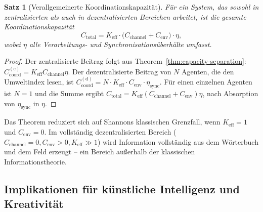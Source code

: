 \documentclass[12pt,a4paper]{article}
\newtheorem{theorem}{Satz}[section]
\theoremstyle{remark}
\begin{document}
	\begin{theorem}[Verallgemeinerte Koordinationskapazität]
		Für ein System, das sowohl in zentralisierten als auch in dezentralisierten Bereichen arbeitet, ist die gesamte Koordinationskapazität
		\begin{equation}
			\boxed{C_{\mathrm{total}} = K_{\mathrm{eff}} \cdot \bigl( C_{\mathrm{channel}} + C_{\mathrm{env}} \bigr) \cdot \eta},
			\label{eq:generalized-capacity}
		\end{equation}
		wobei \(\eta\) alle Verarbeitungs- und Synchronisationsüberhälte umfasst.
	\end{theorem}
	
	\begin{proof}
		Der zentralisierte Beitrag folgt aus Theorem~\ref{thm:capacity-separation}: \(C_{\mathrm{coord}}^{\mathrm{(c)}} = K_{\mathrm{eff}} C_{\mathrm{channel}} \eta\). Der dezentralisierte Beitrag von \(N\) Agenten, die den Umweltindex lesen, ist \(C_{\mathrm{coord}}^{\mathrm{(d)}} = N \cdot K_{\mathrm{eff}} \cdot C_{\mathrm{env}} \cdot \eta_{\mathrm{sync}}\). Für einen einzelnen Agenten ist \(N=1\) und die Summe ergibt \(C_{\mathrm{total}} = K_{\mathrm{eff}}(C_{\mathrm{channel}} + C_{\mathrm{env}})\eta\), nach Absorption von \(\eta_{\mathrm{sync}}\) in \(\eta\).
	\end{proof}
	
	Das Theorem reduziert sich auf Shannons klassischen Grenzfall, wenn \(K_{\mathrm{eff}} = 1\) und \(C_{\mathrm{env}} = 0\). Im vollständig dezentralisierten Bereich (\(C_{\mathrm{channel}} = 0, C_{\mathrm{env}} > 0, K_{\mathrm{eff}} \gg 1\)) wird Information vollständig aus dem Wörterbuch und dem Feld erzeugt – ein Bereich außerhalb der klassischen Informationstheorie.
	
	\subsection{Implikationen für künstliche Intelligenz und Kreativität}
	\label{subsec:AI-dypsdc}
	
\end{document}
